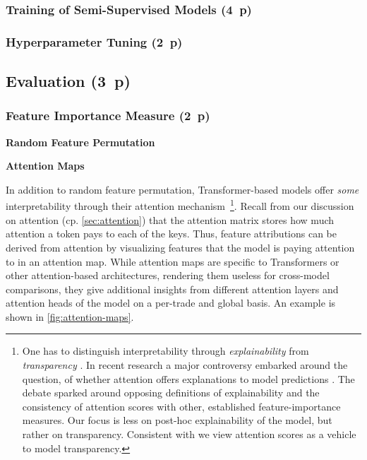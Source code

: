 \subsubsection{Training of Semi-Supervised
    Models (4~p)}\label{sec:training-of-semi-supervised-models}


\subsubsection{Hyperparameter Tuning (2~p)}\label{sec:hyperparameter-tuning}


\subsection{Evaluation (3~p)}\label{sec:evaluation}

\subsubsection{Feature Importance
    Measure (2~p)}\label{sec:feature-importance-measure}

\textbf{Random Feature Permutation}


\textbf{Attention Maps}

In addition to random feature permutation, Transformer-based models offer \emph{some} interpretability through their attention mechanism~\footnote{One has to distinguish interpretability through \emph{explainability} from \emph{transparency} \autocite[][4--5]{liptonMythosModelInterpretability2017}. In recent research a major controversy embarked around the question, of whether attention offers explanations to model predictions \autocites[cp.][150]{bastingsElephantInterpretabilityRoom2020}[][5--7]{jainAttentionNotExplanation2019}[][9]{wiegreffeAttentionNotNot2019}. The debate sparked around opposing definitions of explainability and the consistency of attention scores with other, established feature-importance measures. Our focus is less on post-hoc explainability of the model, but rather on transparency. Consistent with \textcite[][8]{wiegreffeAttentionNotNot2019} we view attention scores as a vehicle to model transparency.
}. Recall from our discussion on attention (cp. \cref{sec:attention}) that the attention matrix stores how much attention a token pays to each of the keys. Thus, feature attributions can be derived from attention by visualizing features that the model is paying attention to in an attention map. While attention maps are specific to Transformers or other attention-based architectures, rendering them useless for cross-model comparisons, they give additional insights from different attention layers and attention heads of the model on a per-trade and global basis. An example is shown in \cref{fig:attention-maps}.

